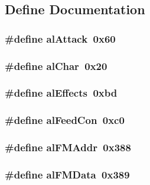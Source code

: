 \subsection{Define Documentation}
\hypertarget{ID__SD_8H_ab81fb8377c8d8128293a787e91564aeb}{
\subsubsection[{alAttack}]{\setlength{\rightskip}{0pt plus 5cm}\#define alAttack~0x60}}
\label{ID__SD_8H_ab81fb8377c8d8128293a787e91564aeb}
\hypertarget{ID__SD_8H_a99ada014bfd6f2caf85af987419a951b}{
\subsubsection[{alChar}]{\setlength{\rightskip}{0pt plus 5cm}\#define alChar~0x20}}
\label{ID__SD_8H_a99ada014bfd6f2caf85af987419a951b}
\hypertarget{ID__SD_8H_a13de5bd9ef6dccbf77fc3a97519374be}{
\subsubsection[{alEffects}]{\setlength{\rightskip}{0pt plus 5cm}\#define alEffects~0xbd}}
\label{ID__SD_8H_a13de5bd9ef6dccbf77fc3a97519374be}
\hypertarget{ID__SD_8H_a290bd6fdb19cb2f8711748538180c428}{
\subsubsection[{alFeedCon}]{\setlength{\rightskip}{0pt plus 5cm}\#define alFeedCon~0xc0}}
\label{ID__SD_8H_a290bd6fdb19cb2f8711748538180c428}
\hypertarget{ID__SD_8H_a7354a8e8690f7722b4d0d4c20a25c866}{
\subsubsection[{alFMAddr}]{\setlength{\rightskip}{0pt plus 5cm}\#define alFMAddr~0x388}}
\label{ID__SD_8H_a7354a8e8690f7722b4d0d4c20a25c866}
\hypertarget{ID__SD_8H_ab7f038f141d7787833ea44c21722d76f}{
\subsubsection[{alFMData}]{\setlength{\rightskip}{0pt plus 5cm}\#define alFMData~0x389}}
